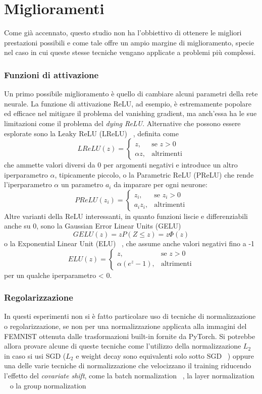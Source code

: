 \section{Miglioramenti}
Come già accennato, questo studio non ha l'obbiettivo di ottenere le 
migliori prestazioni possibili e come tale offre un ampio margine di 
miglioramento, specie nel caso in cui queste stesse tecniche vengano 
applicate a problemi più complessi.  


\subsubsection{Funzioni di attivazione}
Un primo possibile miglioramento 
è quello di cambiare alcuni parametri 
della rete neurale.
La funzione di attivazione ReLU, ad esempio, è 
estremamente popolare ed efficace nel mitigare il problema del 
vanishing gradient, ma anch'essa ha le sue limitazioni come il 
problema del \textit{dying ReLU}. Alternative che possono essere 
esplorate sono la Leaky ReLU (LReLU) ~\cite{Maas2013RectifierNI},
definita come
\[
LReLU(z) = 
\begin{cases} 
      z, & \text{se } z > 0 \\
      \alpha z, & \text{altrimenti}
\end{cases}
\]
che ammette valori diversi da 0 per argomenti negativi e introduce un 
altro iperparametro \(\alpha\), tipicamente piccolo,
o la Parametric ReLU (PReLU) che rende l'iperparametro \(\alpha\)
un parametro \(a_i\) da imparare per ogni neurone:
\[
PReLU(z_i) = 
\begin{cases} 
      z_i, & \text{se } z_i > 0 \\
      a_i z_i, & \text{altrimenti}
\end{cases}
\]
Altre varianti della ReLU interessanti, in quanto funzioni liscie e 
differenziabili anche su 0, sono la Gaussian Error Linear Units (GELU)
~\cite{hendrycks2016gelu}
\[
GELU(z) = z P(Z \le z) = z \Phi(z)
\]
o la Exponential Linear Unit (ELU) ~\cite{clevert2016elu}, 
che assume anche valori negativi fino a -1
\[
ELU(z) = 
\begin{cases} 
      z, & \text{se } z > 0 \\
      \alpha (e^z - 1), & \text{altrimenti}
\end{cases}
\]
per un qualche iperparametro \alpha < 0.


\subsubsection{Regolarizzazione}
In questi esperimenti non si è fatto particolare uso di tecniche di 
normalizzazione o regolarizzazione, se non per una normalizzazione 
applicata alla immagini del FEMNIST ottenuta dalle trasformazioni 
built-in fornite da PyTorch. Si potrebbe allora provare alcune di 
queste tecniche come l'utilizzo della normalizzazione \(L_2\) in caso si 
usi SGD (\(L_2\) e weight decay sono equivalenti solo sotto SGD 
~\cite{Loshchilov2017AdamW}) oppure una delle varie tecniche di 
normalizzazione che velocizzano il training riducendo l'effetto del 
\textit{covariate shift}, come la batch normalization ~\cite{ioffe2015batch},
la layer normalization ~\cite{ba2016layer} o la group normalization 
~\cite{wu2018group}


